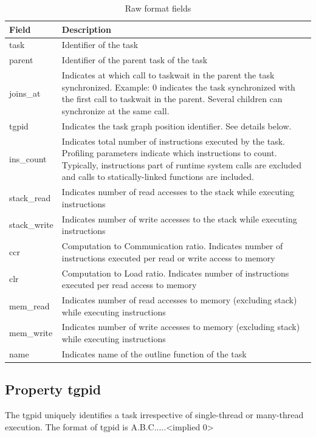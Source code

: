 \documentclass[11pt,a4paper,notitlepage]{article}
\begin{document}
\begin{table}[!htb]
\begin{tabular}{|p{2cm}|p{10cm}|}
\hline
\textbf{Field} & \textbf{Description} \\ \hline
task & Identifier of the task \\ \hline
parent & Identifier of the parent task of the task \\ \hline
joins\_at & Indicates at which call to taskwait in the parent the task synchronized. Example: 0 indicates the task synchronized with the first call to taskwait in the parent. Several children can synchronize at the same call.  \\ \hline
tgpid & Indicates the task graph position identifier. See details below.  \\ \hline
ins\_count & Indicates total number of instructions executed by the task. Profiling parameters indicate which instructions to count. Typically, instructions part of runtime system calls are excluded and calls to statically-linked functions are included.  \\ \hline
stack\_read & Indicates number of read accesses to the stack while executing instructions  \\ \hline
stack\_write & Indicates number of write accesses to the stack while executing instructions \\ \hline
ccr & Computation to Communication ratio. Indicates number of instructions executed per read or write access to memory  \\ \hline
clr & Computation to Load ratio. Indicates number of instructions executed per read access to memory  \\ \hline
mem\_read & Indicates number of read accesses to memory (excluding stack) while executing instructions  \\ \hline
mem\_write & Indicates number of write accesses to memory (excluding stack) while executing instructions  \\ \hline
name & Indicates name of the outline function of the task \\ \hline
\end{tabular}
\caption{Raw format fields}
\label{tab:raw-format}
\end{table}

\subsection{Property tgpid}
The tgpid uniquely identifies a task irrespective of single-thread or many-thread execution. 
The format of tgpid is A.B.C.....<implied 0>
\end{document}
